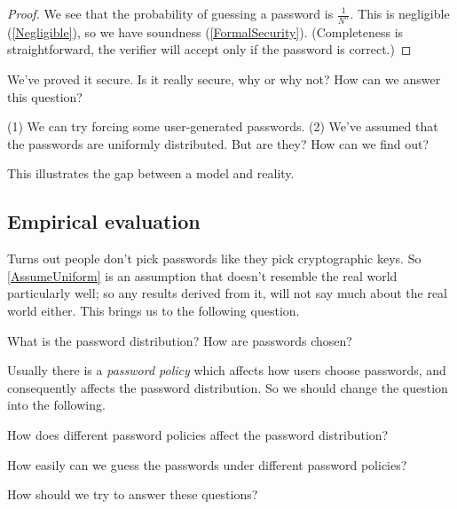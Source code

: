 \begin{frame}
  \begin{proof}
    We see that the probability of guessing a password is \(\frac{1}{N^n}\).
    This is negligible (\cref{Negligible}), so we have soundness 
    (\cref{FormalSecurity}).
    (Completeness is straightforward, the verifier will accept only if the 
    password is correct.)
  \end{proof}
\end{frame}

\begin{frame}
  \begin{exercise}
    We've proved it secure.
    Is it really secure, why or why not?
    How can we answer this question?
  \end{exercise}

  \begin{solution}
    (1) We can try forcing some user-generated passwords.
    (2) We've assumed that the passwords are uniformly distributed.
    But are they?
    How can we find out?
  \end{solution}
\end{frame}

This illustrates the gap between a model and reality.

\subsection{Empirical evaluation}

Turns out people don't pick passwords like they pick cryptographic keys.
So \cref{AssumeUniform} is an assumption that doesn't resemble the real world 
particularly well; so any results derived from it, will not say much about the 
real world either.
This brings us to the following question.

\begin{frame}
\begin{question}\label{PasswordDistribution}
  What is the password distribution?
  How are passwords chosen?
\end{question}
\end{frame}

Usually there is a \emph{password policy} which affects how users choose 
passwords, and consequently affects the password distribution.
So we should change the question into the following.

\begin{frame}
\begin{question}
  How does different password policies affect the password distribution?
\end{question}
\begin{question}\label{Guessability}
  How easily can we guess the passwords under different password policies?
\end{question}
\begin{exercise}
  How should we try to answer these questions?
\end{exercise}
\end{frame}

